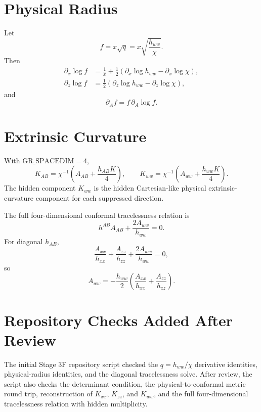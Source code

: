 \documentclass[11pt]{article}
\begin{document}
\section{Physical Radius}

Let
\begin{equation}
  f=x\sqrt{q}=x\sqrt{\frac{h_{ww}}{\chi}}.
\end{equation}
Then
\begin{align}
  \partial_x\log f
  &=
  \frac{1}{x}
  +
  \frac{1}{2}
  \left(\partial_x\log h_{ww}-\partial_x\log\chi\right),\\
  \partial_z\log f
  &=
  \frac{1}{2}
  \left(\partial_z\log h_{ww}-\partial_z\log\chi\right),
\end{align}
and
\begin{equation}
  \partial_A f=f\,\partial_A\log f.
\end{equation}

\section{Extrinsic Curvature}

With \(\mathrm{GR\_SPACEDIM}=4\),
\begin{equation}
  K_{AB}
  =
  \chi^{-1}
  \left(A_{AB}+\frac{h_{AB}K}{4}\right),
  \qquad
  K_{ww}
  =
  \chi^{-1}
  \left(A_{ww}+\frac{h_{ww}K}{4}\right).
\end{equation}
The hidden component \(K_{ww}\) is the hidden Cartesian-like physical
extrinsic-curvature component for each suppressed direction.

The full four-dimensional conformal tracelessness relation is
\begin{equation}
  h^{AB}A_{AB}+\frac{2A_{ww}}{h_{ww}}=0.
\end{equation}
For diagonal \(h_{AB}\),
\begin{equation}
  \frac{A_{xx}}{h_{xx}}
  +
  \frac{A_{zz}}{h_{zz}}
  +
  \frac{2A_{ww}}{h_{ww}}
  =
  0,
\end{equation}
so
\begin{equation}
  A_{ww}
  =
  -\frac{h_{ww}}{2}
  \left(
    \frac{A_{xx}}{h_{xx}}
    +
    \frac{A_{zz}}{h_{zz}}
  \right).
\end{equation}

\section{Repository Checks Added After Review}

The initial Stage 3F repository script checked the \(q=h_{ww}/\chi\)
derivative identities, physical-radius identities, and the diagonal
tracelessness solve. After review, the script also checks the determinant
condition, the physical-to-conformal metric round trip, reconstruction of
\(K_{xx}\), \(K_{zz}\), and \(K_{ww}\), and the full four-dimensional
tracelessness relation with hidden multiplicity.
\end{document}
